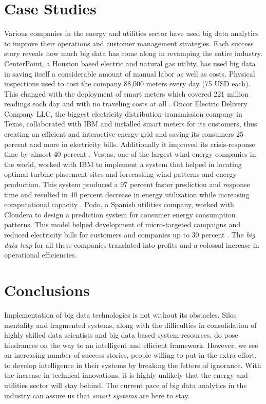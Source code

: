 \section{Case Studies}
Various companies in the energy and utilities sector have used big data analytics to improve their operations and customer management strategies. Each success story reveals how much big data has come along in revamping the entire industry. CenterPoint, a Houston based electric and natural gas utility, has used big data in saving itself a considerable amount of manual labor as well as costs. Physical inspections used to cost the company 88,000 meters every day (75 USD each). This changed with the deployment of smart meters which covered 221 million readings each day and with no traveling costs at all \cite{wharton04}. Oncor Electric Delivery Company LLC, the biggest electricity distribution-transmission company in Texas, collaborated with IBM and installed smart meters for its customers, thus creating an efficient and interactive energy grid and saving its consumers 25 percent and more in electricity bills. Additionally it improved its crisis-response time by almost 40 percent \cite{oncor19}. Vestas, one of the largest wind energy companies in the world, worked with IBM to implement a system that helped in locating optimal turbine placement sites and forecasting wind patterns and energy production. This system produced a 97 percent faster prediction and response time and resulted in 40 percent decrease in energy utilization while increasing computational capacity \cite{vestas21}. Podo, a Spanish utilities company, worked with Cloudera to design a prediction system for consumer energy consumption patterns. This model helped development of micro-targeted campaigns and reduced electricity bills for customers and companies up to 30 percent \cite{cloud20}. The {\em big data leap} for all these companies translated into profits and a colossal increase in operational efficiencies.

\section{Conclusions}
Implementation of big data technologies is not without its obstacles. Silos mentality and fragmented systems, along with the difficulties in consolidation of highly skilled data scientists and big data based system resources, do pose hindrances on the way to an intelligent and efficient framework. However, we see an increasing number of success stories, people willing to put in the extra effort, to develop intelligence in their systems by breaking the fetters of ignorance. With the increase in technical innovations, it is highly unlikely that the energy and utilities sector will stay behind. The current pace of big data analytics in the industry can assure us that {\em smart systems} are here to stay. 




